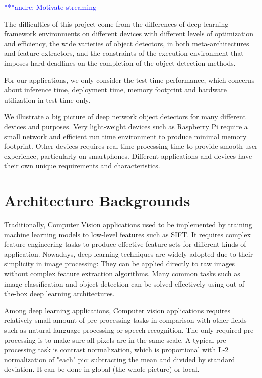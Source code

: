 \documentclass[conference]{IEEEtran}
\newcommand{\alnote}[1]{ {\textcolor{blue} { ***andre: #1 }}}
\newcommand{\alnote}[1]{}
\begin{document}

\alnote{Motivate streaming}

The difficulties of this project come from the differences of deep learning framework environments on different devices with different levels of optimization and efficiency, the wide varieties of object detectors, in both meta-architectures and feature extractors, and the constraints of the execution environment that imposes hard deadlines on the completion of the object detection methods.

For our applications, we only consider the test-time performance, which concerns about inference time, deployment time, memory footprint and hardware utilization in test-time only.

We illustrate a big picture of deep network object detectors for many different devices and purposes. Very light-weight devices such as Raspberry Pi require a small network and efficient run time environment to produce minimal memory footprint. Other devices requires real-time processing time to provide smooth user experience, particularly on smartphones. Different applications and devices have their own unique requirements and characteristics. 

\section{Architecture Backgrounds}

Traditionally, Computer Vision applications used to be implemented by training machine learning models to low-level features such as SIFT. It requires complex feature engineering tasks to produce effective feature sets for different kinds of application. Nowadays, deep learning techniques are widely adopted due to their simplicity in image processing: They can be applied directly to raw images without complex feature extraction algorithms. Many common tasks such as image classification and object detection can be solved effectively using out-of-the-box deep learning architectures.

Among deep learning applications, Computer vision applications requires relatively small amount of pre-processing tasks in comparison with other fields such as natural language processing or speech recognition. The only required pre-processing is to make sure all pixels are in the same scale. A typical pre-processing task is contrast normalization, which is proportional with L-2 normalization of "each" pic: subtracting the mean and divided by standard deviation. It can be done in global (the whole picture) or local. 
\end{document}
